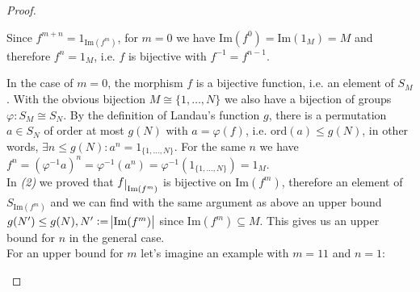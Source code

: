 \begin{proof}[Proof\nopunct]
\begin{subproof}[Proof of (3).]
Since $f^{m+n} = 1_{\mathrm{Im}(f^{m})}$, for $m = 0$ we have
$\mathrm{Im}(f^{0}) = \mathrm{Im}(1_{M}) = M$ and therefore
$f^{n} = 1_{M}$, i.e. $f$ is bijective with $f^{-1} = f^{n-1}$.
\end{subproof}
\begin{subproof}[Proof of (4).]
In the case of $m = 0$, the morphism $f$ is a bijective function, i.e. an element of $S_{M}$. With the obvious
bijection $M \cong \{1,\dots,N\}$ we also have a bijection of groups $\varphi : S_{M} \cong S_{N}$. By the definition
of Landau's function $g$, there is a permutation $a \in S_{N}$ of order at most $g(N)$ with $a = \varphi(f)$, i.e.
$\mathrm{ord}(a) \leq g(N)$, in other words, $\exists n\leq g(N) : a^{n} = 1_{\{1,\dots,N\}}$. For the same $n$ we have
$f^{n} = (\varphi^{-1}a)^{n} = \varphi^{-1}(a^{n}) = \varphi^{-1}(1_{\{1,\dots,N\}}) = 1_{M}$.\\
In \textit{(2)} we proved that $f\restrict{\mathrm{Im}(f^{m})}$ is bijective on $\mathrm{Im}(f^{m})$, therefore an element of
$S_{\mathrm{Im}(f^{m})}$ and we can find with the same argument as above an upper bound $g(N') \leq g(N), N' := \abs{\mathrm{Im}(f^{m})}$
since $\mathrm{Im}(f^{m}) \subseteq M$. This gives us an upper bound for $n$ in the general case.\\
For an upper bound for $m$ let's imagine an example with $m=11$ and $n=1$:\\

\end{subproof}
\end{proof}

